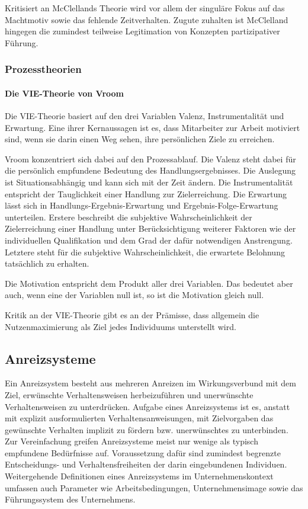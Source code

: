 Kritisiert an McClellands Theorie wird vor allem der singuläre Fokus auf das Machtmotiv sowie das fehlende Zeitverhalten. Zugute zuhalten ist McClelland hingegen die zumindest teilweise Legitimation von Konzepten partizipativer Führung. \citep[S. 398]{Drumm.2008}

\subsubsection{Prozesstheorien}
\paragraph{Die VIE-Theorie von Vroom}
Die VIE-Theorie basiert auf den drei Variablen Valenz, Instrumentalität und Erwartung. Eine ihrer Kernaussagen ist es, dass Mitarbeiter zur Arbeit motiviert sind, wenn sie darin einen Weg sehen, ihre persönlichen Ziele zu erreichen. \citep[S. 30]{Nowka.2013}
 
Vroom konzentriert sich dabei auf den Prozessablauf. Die Valenz steht dabei für die \glqq […] persönlich empfundene Bedeutung des Handlungsergebnisses\grqq. \citep[S. 31]{Nowka.2013} Die Auslegung ist Situationsabhängig und kann sich mit der Zeit ändern. Die Instrumentalität entspricht der Tauglichkeit einer Handlung zur Zielerreichung. Die Erwartung lässt sich in Handlungs-Ergebnis-Erwartung und Ergebnis-Folge-Erwartung unterteilen.
Erstere beschreibt die subjektive Wahrscheinlichkeit der Zielerreichung einer Handlung unter Berücksichtigung weiterer Faktoren wie der individuellen Qualifikation und dem Grad der dafür notwendigen Anstrengung.
Letztere steht für die subjektive Wahrscheinlichkeit, die erwartete Belohnung tatsächlich zu erhalten. \citep[S. 31]{Nowka.2013}
 
Die Motivation entspricht dem Produkt aller drei Variablen. Das bedeutet aber auch, wenn eine der Variablen null ist, so ist die Motivation gleich null. \citep[S. 31]{Nowka.2013}
 
Kritik an der VIE-Theorie gibt es an der Prämisse, dass allgemein die Nutzenmaximierung als Ziel jedes Individuums unterstellt wird. \citep[S. 401]{Drumm.2008}

\subsection{Anreizsysteme}
Ein Anreizsystem besteht aus mehreren Anreizen im Wirkungsverbund mit dem Ziel, erwünschte Verhaltensweisen herbeizuführen und unerwünschte Verhaltensweisen zu unterdrücken. Aufgabe eines Anreizsystems ist es, anstatt mit explizit ausformulierten Verhaltensanweisungen, mit Zielvorgaben das gewünschte Verhalten implizit zu fördern bzw. unerwünschtes zu unterbinden. Zur Vereinfachung greifen Anreizsysteme meist nur wenige als typisch empfundene Bedürfnisse auf. Voraussetzung dafür sind zumindest begrenzte Entscheidungs- und Verhaltensfreiheiten der darin eingebundenen Individuen. Weitergehende Definitionen eines Anreizsystems im Unternehmenskontext umfassen auch Parameter wie Arbeitsbedingungen, Unternehmensimage sowie das Führungssystem des Unternehmens. \citep[S. 458]{Drumm.2008}

